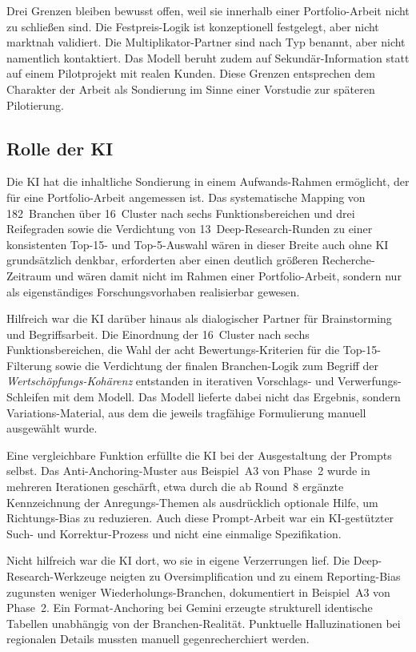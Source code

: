 \documentclass[a4paper,11pt]{article}
\begin{document}
Drei Grenzen bleiben bewusst offen, weil sie innerhalb einer
Portfolio-Arbeit nicht zu schließen sind. Die Festpreis-Logik ist
konzeptionell festgelegt, aber nicht marktnah validiert. Die
Multiplikator-Partner sind nach Typ benannt, aber nicht namentlich
kontaktiert. Das Modell beruht zudem auf Sekundär-Information statt
auf einem Pilotprojekt mit realen Kunden. Diese Grenzen entsprechen
dem Charakter der Arbeit als Sondierung im Sinne einer Vorstudie zur
späteren Pilotierung.

\subsection{Rolle der KI}

Die KI hat die inhaltliche Sondierung in einem Aufwands-Rahmen
ermöglicht, der für eine Portfolio-Arbeit angemessen ist. Das
systematische Mapping von 182~Branchen über 16~Cluster nach sechs
Funktionsbereichen und drei Reifegraden sowie die Verdichtung von
13~Deep-Research-Runden zu einer konsistenten Top-15- und
Top-5-Auswahl wären in dieser Breite auch ohne KI grundsätzlich
denkbar, erforderten aber einen deutlich größeren Recherche-Zeitraum
und wären damit nicht im Rahmen einer Portfolio-Arbeit, sondern nur
als eigenständiges Forschungsvorhaben realisierbar gewesen.

Hilfreich war die KI darüber hinaus als dialogischer Partner für
Brainstorming und Begriffsarbeit. Die Einordnung der 16~Cluster nach
sechs Funktionsbereichen, die Wahl der acht Bewertungs-Kriterien für
die Top-15-Filterung sowie die Verdichtung der finalen Branchen-Logik
zum Begriff der \emph{Wertschöpfungs-Kohärenz} entstanden in
iterativen Vorschlags- und Verwerfungs-Schleifen mit dem Modell. Das
Modell lieferte dabei nicht das Ergebnis, sondern Variations-Material,
aus dem die jeweils tragfähige Formulierung manuell ausgewählt wurde.

Eine vergleichbare Funktion erfüllte die KI bei der Ausgestaltung der
Prompts selbst. Das Anti-Anchoring-Muster aus Beispiel~A3 von Phase~2
wurde in mehreren Iterationen geschärft, etwa durch die ab Round~8
ergänzte Kennzeichnung der Anregungs-Themen als ausdrücklich optionale
Hilfe, um Richtungs-Bias zu reduzieren. Auch diese Prompt-Arbeit war
ein KI-gestützter Such- und Korrektur-Prozess und nicht eine einmalige
Spezifikation.

Nicht hilfreich war die KI dort, wo sie in eigene Verzerrungen lief. Die
Deep-Research-Werkzeuge neigten zu Oversimplification und zu einem
Reporting-Bias zugunsten weniger Wiederholungs-Branchen, dokumentiert in
Beispiel~A3 von Phase~2. Ein Format-Anchoring bei Gemini erzeugte
strukturell identische Tabellen unabhängig von der Branchen-Realität.
Punktuelle Halluzinationen bei regionalen Details mussten manuell
gegenrecherchiert werden.
\end{document}
